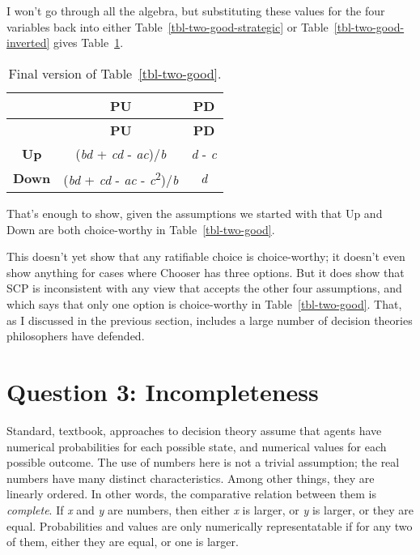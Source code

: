 \documentclass[
  10pt,
  letterpaper,
  DIV=11,
  numbers=noendperiod,
  twoside]{scrartcl}
\begin{document}
I won't go through all the algebra, but substituting these values for
the four variables back into either Table~\ref{tbl-two-good-strategic}
or Table~\ref{tbl-two-good-inverted} gives
Table~\ref{tbl-two-good-final}.

\begin{longtable}[]{@{}ccc@{}}
\caption{Final version of
Table~\ref{tbl-two-good}.}\label{tbl-two-good-final}\tabularnewline
\toprule\noalign{}
& \textbf{PU} & \textbf{PD} \\
\midrule\noalign{}
\endfirsthead
\toprule\noalign{}
& \textbf{PU} & \textbf{PD} \\
\midrule\noalign{}
\endhead
\bottomrule\noalign{}
\endlastfoot
\textbf{Up} & (\emph{bd} + \emph{cd} - \emph{ac})/\emph{b} & \emph{d} -
\emph{c} \\
\textbf{Down} & (\emph{bd} + \emph{cd} - \emph{ac} -
\emph{c}\textsuperscript{2})/\emph{b} & \emph{d} \\
\end{longtable}

That's enough to show, given the assumptions we started with that Up and
Down are both choice-worthy in Table~\ref{tbl-two-good}.

This doesn't yet show that any ratifiable choice is choice-worthy; it
doesn't even show anything for cases where Chooser has three options.
But it does show that SCP is inconsistent with any view that accepts the
other four assumptions, and which says that only one option is
choice-worthy in Table~\ref{tbl-two-good}. That, as I discussed in the
previous section, includes a large number of decision theories
philosophers have defended.

\section{Question 3: Incompleteness}\label{sec-incompleteness}

Standard, textbook, approaches to decision theory assume that agents
have numerical probabilities for each possible state, and numerical
values for each possible outcome. The use of numbers here is not a
trivial assumption; the real numbers have many distinct characteristics.
Among other things, they are linearly ordered. In other words, the
comparative relation between them is \emph{complete}. If \emph{x} and
\emph{y} are numbers, then either \emph{x} is larger, or \emph{y} is
larger, or they are equal. Probabilities and values are only numerically
representatable if for any two of them, either they are equal, or one is
larger.
\end{document}
